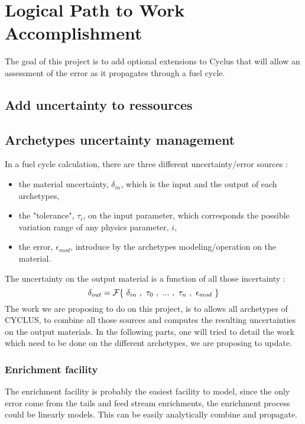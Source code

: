 \documentclass[dvips,12pt]{article}
\begin{document}
\section{Logical Path to Work Accomplishment}
The goal of this project is to add optional extensions to Cyclus that will allow an assessment of the error as it propagates  through a fuel cycle. 
\subsection{Add uncertainty to ressources}

\subsection{Archetypes uncertainty management}
In a fuel cycle calculation, there are three different uncertainty/error sources :
\begin{itemize}
\item the material uncertainty, $\delta_{in}$, which is the input and the output of each archetypes,
\item the "tolerance", $\tau_{i}$,  on the input parameter, which corresponds the possible variation range of any physics parameter, $i$,
\item the error, $\epsilon_{mod}$, introduce by the archetypes modeling/operation on the material.
\end{itemize}

The uncertainty on the output  material is a function of all those incertainty :
\begin{equation}
\delta_{out} = {\cal F}\{~\delta _{in}~,~\tau_0~,~...~,~\tau_n~,~\epsilon_{mod}~\}
\end{equation}
The work we are proposing to do on this project, is to allows all archetypes of CYCLUS, to combine all those sources and computes the resulting uncertainties on the output materials.
In the following parts, one will tried to detail the work which need to be done on the different archetypes, we are proposing to update.
\subsubsection{Enrichment facility}
The enrichment facility is probably the easiest facility to model, since the only error come from the tails and feed stream enrichments, the enrichment process could be linearly models. This can be easily analytically combine and propagate.%
\end{document}
